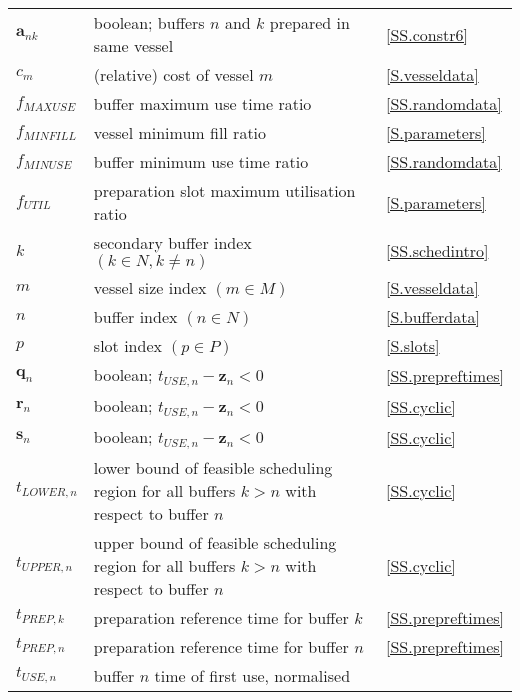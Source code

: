 {\begin{longtabu} to 
     &  & \\\hline
    \endhead
    $\boldsymbol{a}_{nk}$ & boolean; buffers $n$ and $k$ prepared in same
    vessel & \ref{SS.constr6}\\
    $c_{m}$ & (relative) cost of vessel $m$ & \ref{S.vesseldata}\\
    $f_{\mathit{MAXUSE}}$ & buffer maximum use time ratio 
        & \ref{SS.randomdata}\\
    $f_{\mathit{MINFILL}}$ & vessel minimum fill ratio & \ref{S.parameters}\\
    $f_{\mathit{MINUSE}}$ & buffer minimum use time ratio 
        & \ref{SS.randomdata}\\
    $f_{\mathit{UTIL}}$ & preparation slot maximum utilisation ratio
        & \ref{S.parameters}\\
    $k$ & secondary buffer index $\left( k \in N, k \ne n \right)$
        & \ref{SS.schedintro}\\
    $m$ & vessel size index $\left( m \in M \right)$ & \ref{S.vesseldata}\\
    $n$ & buffer index $\left( n \in N \right)$ & \ref{S.bufferdata}\\
    $p$ & slot index $\left( p \in P \right)$ & \ref{S.slots}\\
    $\boldsymbol{q}_{n}$ & boolean; 
        $t_{\mathit{USE},n} - \boldsymbol{z}_{n} < 0$ & \ref{SS.prepreftimes}\\
    $\boldsymbol{r}_{n}$ & boolean; 
        $t_{\mathit{USE},n} - \boldsymbol{z}_{n} < 0$ & \ref{SS.cyclic}\\
    $\boldsymbol{s}_{n}$ & boolean; 
        $t_{\mathit{USE},n} - \boldsymbol{z}_{n} < 0$ & \ref{SS.cyclic}\\
    $t_{\mathit{LOWER},n}$ & lower bound of feasible scheduling region for all
        buffers $k > n$ with respect to buffer $n$ & \ref{SS.cyclic}\\
    $t_{\mathit{UPPER},n}$ & upper bound of feasible scheduling region for all
        buffers $k > n$ with respect to buffer $n$ & \ref{SS.cyclic}\\
    $t_{\mathit{PREP},k}$ & preparation reference time for buffer $k$ 
        & \ref{SS.prepreftimes}\\
    $t_{\mathit{PREP},n}$ & preparation reference time for buffer $n$ 
        & \ref{SS.prepreftimes}\\
    $t_{\mathit{USE},n}$ & buffer $n$ time of first use, normalised

\end{longtabu}}
